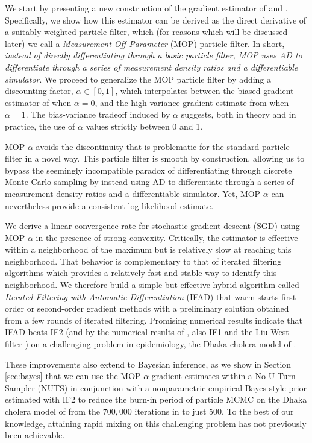 \documentclass[11pt]{article}
\begin{document}
We start by presenting a new construction of the gradient estimator of \cite{scibior21} and \cite{poyiadjis11}.
Specifically, we show how this estimator can be derived as the direct derivative of a suitably weighted particle filter, which (for reasons which will be discussed later) we call a {\it Measurement Off-Parameter} (MOP) particle filter. In short, \textit{instead of directly differentiating through a basic particle filter, MOP uses AD to differentiate through a series of measurement density ratios and a differentiable simulator}.
We proceed to generalize the MOP particle filter by adding a discounting factor, $\alpha \in [0,1]$, which interpolates between the  biased gradient estimator of \cite{naesseth18} when $\alpha=0$, and the high-variance gradient estimate from \cite{poyiadjis11, scibior21} when $\alpha=1$.
The bias-variance tradeoff induced by $\alpha$ suggests, both in theory and in practice, the use of $\alpha$ values strictly between 0 and 1.

MOP-$\alpha$ avoids the discontinuity that is problematic for the standard particle filter in a novel way.
This particle filter is smooth by construction, allowing us to bypass the seemingly incompatible paradox of differentiating through discrete Monte Carlo sampling by instead using AD to differentiate through a series of measurement density ratios and a differentiable simulator.
Yet, MOP-$\alpha$ can nevertheless provide a consistent log-likelihood estimate.

We derive a linear convergence rate for stochastic gradient descent (SGD) using MOP-$\alpha$ in the  presence of strong convexity.
Critically, the estimator is effective within a neighborhood of the maximum but is relatively slow at reaching this neighborhood.
That behavior is complementary to that of iterated filtering algorithms \cite{ionides06-pnas,ionides15} which provides a relatively fast and stable way to identify this neighborhood.
We therefore build a simple but effective hybrid algorithm called {\it Iterated Filtering with Automatic Differentiation} (IFAD) that warm-starts first-order or second-order gradient methods with a preliminary solution obtained from a few rounds of iterated filtering.
Promising numerical results indicate that IFAD beats IF2 (and by the numerical results of \cite{ionides15}, also IF1 \cite{ionides06-pnas,ionides11} and the Liu-West filter \cite{liuwest01}) on a challenging problem in epidemiology, the Dhaka cholera model of \cite{king08}.

These improvements also extend to Bayesian inference, as we show in Section \ref{sec:bayes} that we can use the MOP-$\alpha$ gradient estimates within a No-U-Turn Sampler (NUTS) \cite{homan14} in conjunction with a nonparametric empirical Bayes-style prior estimated with IF2 to reduce the burn-in period of particle MCMC \cite{andrieu10} on the Dhaka cholera model of \cite{king08} from the $700,000$ iterations in \cite{fasiolo16} to just $500$. To the best of our knowledge, attaining rapid mixing on this challenging problem has not previously been achievable. 
\end{document}
